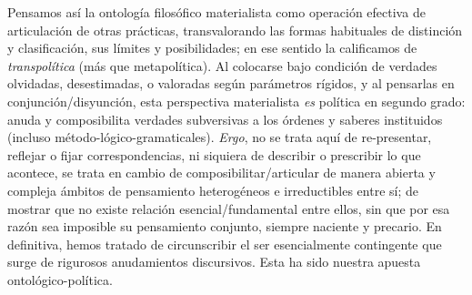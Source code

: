 Pensamos así la ontología filosófico materialista como operación
efectiva de articulación de otras prácticas, transvalorando las formas
habituales de distinción y clasificación, sus límites y posibilidades;
en ese sentido la calificamos de \emph{transpolítica} (más que
metapolítica). Al colocarse bajo condición de verdades olvidadas,
desestimadas, o valoradas según parámetros rígidos, y al pensarlas en
conjunción/disyunción, esta perspectiva materialista \emph{es} política
en segundo grado: anuda y composibilita verdades subversivas a los
órdenes y saberes instituidos (incluso método-lógico-gramaticales).
\emph{Ergo}, no se trata aquí de re-presentar, reflejar o fijar
correspondencias, ni siquiera de describir o prescribir lo que acontece,
se trata en cambio de composibilitar/articular de manera abierta y
compleja ámbitos de pensamiento heterogéneos e irreductibles entre sí;
de mostrar que no existe relación esencial/fundamental entre ellos, sin
que por esa razón sea imposible su pensamiento conjunto, siempre
naciente y precario. En definitiva, hemos tratado de circunscribir el
ser esencialmente contingente que surge de rigurosos anudamientos
discursivos. Esta ha sido  nuestra apuesta
ontológico-política.

\ifPDF
{}
\fi